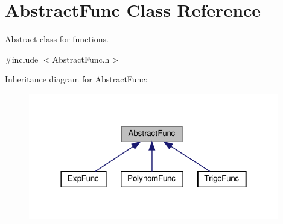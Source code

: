\hypertarget{classAbstractFunc}{}\section{Abstract\+Func Class Reference}
\label{classAbstractFunc}


Abstract class for functions.  




{\ttfamily \#include $<$Abstract\+Func.\+h$>$}



Inheritance diagram for Abstract\+Func\+:\nopagebreak
\begin{figure}[H]
\begin{center}
\leavevmode
\includegraphics[width=310pt]{classAbstractFunc__inherit__graph}
\end{center}
\end{figure}
